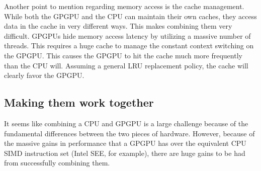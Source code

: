 Another point to mention regarding memory access is the cache management. While both the GPGPU and the CPU can maintain their own caches, they access data in the cache in very different ways. This makes combining them very difficult. GPGPUs hide memory access latency by utilizing a massive number of threads. This requires a huge cache to manage the constant context switching on the GPGPU. This causes the GPGPU to hit the cache much more frequently than the CPU will. Assuming a general LRU replacement policy, the cache will clearly favor the GPGPU. \cite{tlpcache}

\subsection*{Making them work together}

It seems like combining a CPU and GPGPU is a large challenge because of the fundamental differences between the two pieces of hardware. However, because of the massive gains in performance that a GPGPU has over the equivalent CPU SIMD instruction set (Intel SEE, for example), there are huge gains to be had from successfully combining them. 














